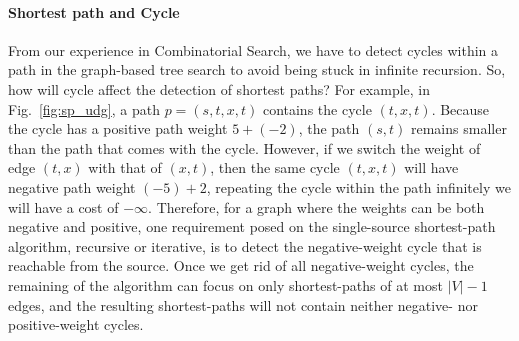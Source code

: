 \documentclass[../main.tex]{subfiles}
\begin{document}
\paragraph{Shortest path and Cycle} From our experience in Combinatorial Search, we have to detect cycles within a path in the graph-based tree search to avoid being stuck in infinite recursion. So, how will cycle affect the detection of shortest paths? For example, in Fig.~\ref{fig:sp_udg}, a path $p=(s, t, x, t)$ contains the cycle $(t, x, t)$.  Because the cycle has a positive path weight $5+(-2)$, the path $(s, t)$ remains smaller than the path that comes with the cycle. However, if we switch the weight of edge $(t, x)$ with that of $(x, t)$, then the same cycle $(t, x, t)$ will have negative path weight $(-5)+2$, repeating the cycle within the path infinitely we will have a cost of $-\infty$. Therefore, for a graph where the weights can be both negative and positive, one requirement posed on the single-source shortest-path algorithm, recursive or iterative, is to detect the negative-weight cycle that is reachable from the source. Once we get rid of all negative-weight cycles, the remaining of the algorithm can focus on only shortest-paths of at most $|V|-1$ edges, and the resulting shortest-paths will not contain neither negative- nor positive-weight cycles.
\end{document}
